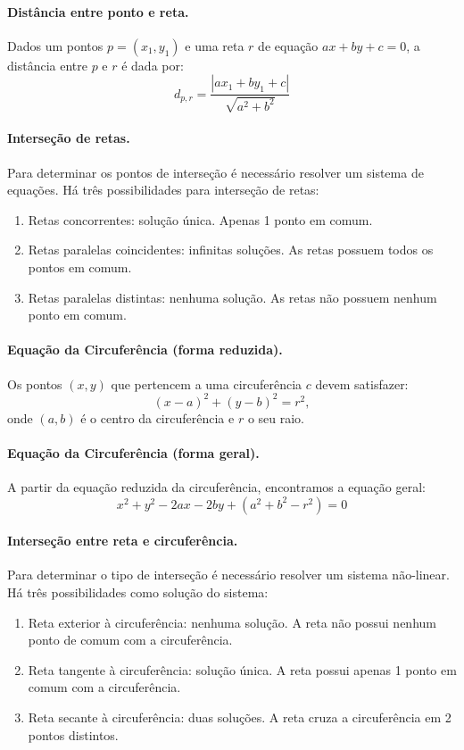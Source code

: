 \paragraph{Distância entre ponto e reta.} Dados um pontos $p = (x_1,y_1)$ e uma reta $r$ de equação $ax+by+c=0$, a distância entre $p$ e $r$ é dada por:
		$$d_{p,r} = \frac{|ax_1+by_1+c|}{\sqrt{a^2+b^2}}$$

\paragraph{Interseção de retas.} Para determinar os pontos de interseção é necessário resolver um sistema de equações. Há três possibilidades para interseção de retas:
		\begin{enumerate}
			\item Retas concorrentes: solução única. Apenas 1 ponto em comum.
			\item Retas paralelas coincidentes: infinitas soluções. As retas possuem todos os pontos em comum.
			\item Retas paralelas distintas: nenhuma solução. As retas não possuem nenhum ponto em comum.
		\end{enumerate}

\paragraph{Equação da Circuferência (forma reduzida).} Os pontos $(x,y)$ que pertencem a uma circuferência $c$ devem satisfazer:
		$$(x-a)^2+(y-b)^2 = r^2,$$
		onde $(a,b)$ é o centro da circuferência e $r$ o seu raio.

\paragraph{Equação da Circuferência (forma geral).} A partir da equação reduzida da circuferência, encontramos a equação geral:
		$$x^2 +y^2-2ax-2by+(a^2+b^2-r^2)=0$$

\paragraph{Interseção entre reta e circuferência.} Para determinar o tipo de interseção é necessário resolver um sistema não-linear. Há três possibilidades como solução do sistema:
		\begin{enumerate}
			\item Reta exterior à circuferência: nenhuma solução. A reta não possui nenhum ponto de comum com a circuferência.
			\item Reta tangente à circuferência: solução única. A reta possui apenas 1 ponto em comum com a circuferência.
			\item Reta secante à circuferência: duas soluções. A reta cruza a circuferência em 2 pontos distintos.
		\end{enumerate}

